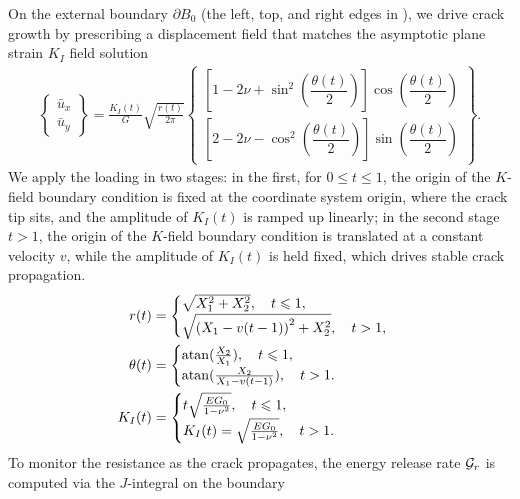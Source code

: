 On the external boundary $\partial B_0$ (the left, top, and right edges in ), we drive crack growth by prescribing a displacement field that matches the asymptotic plane strain $K_I$ field solution
\begin{align}
  \label{eq:surfing_bc}
  \begin{Bmatrix}
    \bar{u}_x
    \\
    \bar{u}_y
  \end{Bmatrix}
  = \frac{K_I(t)}{G} \sqrt{\frac{r(t)}{2 \pi}}
  \begin{Bmatrix}
    \left[ 1 - 2\nu + \sin^2 \left( \dfrac{\theta(t)}{2} \right) \right] \cos \left(\dfrac{\theta(t)}{2} \right)
    \\[1em]
    \left[ 2 - 2\nu - \cos^2 \left( \dfrac{\theta(t)}{2} \right) \right] \sin \left(\dfrac{\theta(t)}{2} \right)
  \end{Bmatrix}.
\end{align}
We apply the loading in two stages: in the first, for $0 \leq t \leq 1$, the origin of the $K$-field boundary condition is fixed at the coordinate system origin, where the crack tip sits, and the amplitude of $K_I(t)$ is ramped up linearly; in the second stage $t > 1$, the origin of the $K$-field boundary condition is translated at a constant velocity $v$, while the amplitude of $K_I(t)$ is held fixed, which drives stable crack propagation.
\begin{align}
  r(t)      & =              
  \begin{cases}
    \sqrt{X_1^2 + X_2^2}, \quad t \leqslant 1, \\
    \sqrt{\left( X_1 - v(t-1) \right)^2 + X_2^2}, \quad t > 1,
  \end{cases} \\
  \theta(t) & =              
  \begin{cases}
    \operatorname{atan}(\frac{X_2}{X_1 }), \quad t \leqslant 1, \\
    \operatorname{atan}(\frac{X_2}{X_1 - v(t-1)}), \quad t > 1.
  \end{cases} \\
  K_I(t)    & =              
  \begin{cases}
    t \sqrt{\frac{E G_0}{1 - \nu^2}}, \quad t \leqslant 1, \\
    K_I(t) = \sqrt{\frac{E G_0}{1 - \nu^2}}, \quad t > 1.
  \end{cases}
\end{align}
To monitor the resistance as the crack propagates, the energy release rate ${\mathcal{G}_r}$ is computed via the $J$-integral on the boundary \citep{rice_path_1968}
